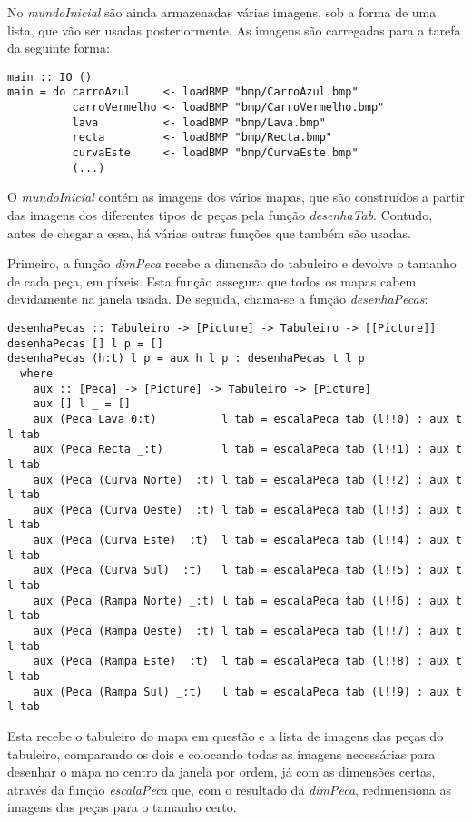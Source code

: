 \documentclass[a4paper]{report}
\begin{document}
No \textit{mundoInicial} são ainda armazenadas várias imagens, sob a forma de uma lista, que vão ser usadas posteriormente. As imagens são carregadas para a tarefa da seguinte forma:

\begin{verbatim}
main :: IO ()  
main = do carroAzul     <- loadBMP "bmp/CarroAzul.bmp"
          carroVermelho <- loadBMP "bmp/CarroVermelho.bmp"
          lava          <- loadBMP "bmp/Lava.bmp"
          recta         <- loadBMP "bmp/Recta.bmp"
          curvaEste     <- loadBMP "bmp/CurvaEste.bmp"
          (...)
\end{verbatim}

O \textit{mundoInicial} contém as imagens dos vários mapas, que são construídos a partir das imagens dos diferentes tipos de peças pela função \textit{desenhaTab}. Contudo, antes de chegar a essa, há várias outras funções que também são usadas.

Primeiro, a função \textit{dimPeca} recebe a dimensão do tabuleiro e devolve o tamanho de cada peça, em píxeis. Esta função assegura que todos os mapas cabem devidamente na janela usada. De seguida, chama-se a função \textit{desenhaPecas}:

\begin{verbatim}
desenhaPecas :: Tabuleiro -> [Picture] -> Tabuleiro -> [[Picture]]
desenhaPecas [] l p = []
desenhaPecas (h:t) l p = aux h l p : desenhaPecas t l p
  where
    aux :: [Peca] -> [Picture] -> Tabuleiro -> [Picture]
    aux [] l _ = []
    aux (Peca Lava 0:t)          l tab = escalaPeca tab (l!!0) : aux t l tab       
    aux (Peca Recta _:t)         l tab = escalaPeca tab (l!!1) : aux t l tab
    aux (Peca (Curva Norte) _:t) l tab = escalaPeca tab (l!!2) : aux t l tab
    aux (Peca (Curva Oeste) _:t) l tab = escalaPeca tab (l!!3) : aux t l tab
    aux (Peca (Curva Este) _:t)  l tab = escalaPeca tab (l!!4) : aux t l tab
    aux (Peca (Curva Sul) _:t)   l tab = escalaPeca tab (l!!5) : aux t l tab
    aux (Peca (Rampa Norte) _:t) l tab = escalaPeca tab (l!!6) : aux t l tab
    aux (Peca (Rampa Oeste) _:t) l tab = escalaPeca tab (l!!7) : aux t l tab
    aux (Peca (Rampa Este) _:t)  l tab = escalaPeca tab (l!!8) : aux t l tab
    aux (Peca (Rampa Sul) _:t)   l tab = escalaPeca tab (l!!9) : aux t l tab
\end{verbatim}

Esta recebe o tabuleiro do mapa em questão e a lista de imagens das peças do tabuleiro, comparando os dois e colocando todas as imagens necessárias para desenhar o mapa no centro da janela por ordem, já com as dimensões certas, através da função \textit{escalaPeca} que, com o resultado da \textit{dimPeca}, redimensiona as imagens das peças para o tamanho certo.
\end{document}
